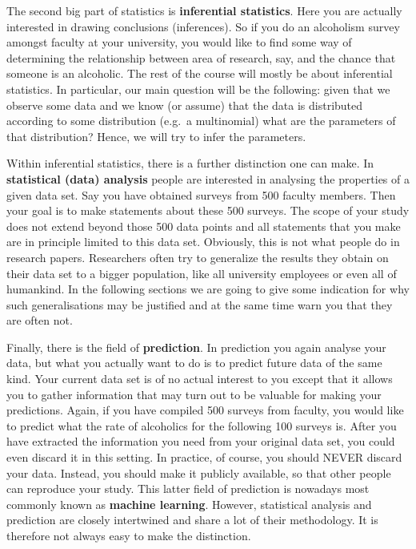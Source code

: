 The second big part of statistics is \textbf{inferential statistics}. Here you are actually interested in drawing
conclusions (inferences). So if you do an alcoholism survey amongst faculty at your university, you would like to find some
way of determining the relationship between area of research, say, and the chance that someone is an alcoholic. The rest of the
course will mostly be about inferential statistics. In particular, our main question will be the following: given that we observe some data and
we know (or assume) that the data is distributed according to some distribution (e.g.\ a multinomial) what are the parameters of that distribution? Hence, we will try to infer the parameters.

Within inferential statistics, there is a further distinction one can make. In \textbf{statistical (data) analysis} people are interested in analysing
the properties of a given data set. Say you have obtained surveys from 500 faculty members. Then your goal is to make
statements about these 500 surveys. The scope of your study does not extend beyond those 500 data points and all statements that you make
are in principle limited to this data set. Obviously, this is not what people do in research papers. Researchers
often try to generalize the results they obtain on their data set to a bigger population, like all university employees or even
all of humankind. In the following sections we are going to give some indication for why such generalisations may be justified and
at the same time warn you that they are often not.

Finally, there is the field of \textbf{prediction}. In prediction you again analyse your data, but what you actually want to
do is to predict future data of the same kind. Your current data set is of no actual interest to you except that it allows you
to gather information that may turn out to be valuable for making your predictions. Again, if you have compiled 500 surveys from 
faculty, you would like to predict what the rate of alcoholics for the following 100 surveys is. After you have extracted
the information you need from your original data set, you could even discard it in this setting. In practice, of course, you 
should NEVER discard your data. Instead, you should make it publicly available, so that other people can reproduce your study.
This latter field of prediction is nowadays most commonly known as \textbf{machine learning}. However, statistical analysis and 
prediction are closely intertwined and share a lot of their methodology. It is therefore not always easy to make the distinction.


